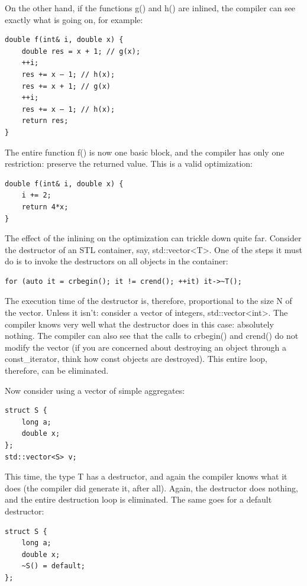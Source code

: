 On the other hand, if the functions g() and h() are inlined, the compiler can see exactly what is going on, for example:

\begin{lstlisting}[style=styleCXX]
double f(int& i, double x) {
	double res = x + 1; // g(x);
	++i;
	res += x – 1; // h(x);
	res += x + 1; // g(x)
	++i;
	res += x – 1; // h(x);
	return res;
}
\end{lstlisting}

The entire function f() is now one basic block, and the compiler has only one restriction: preserve the returned value. This is a valid optimization:

\begin{lstlisting}[style=styleCXX]
double f(int& i, double x) {
	i += 2;
	return 4*x;
}
\end{lstlisting}

The effect of the inlining on the optimization can trickle down quite far. Consider the destructor of an STL container, say, std::vector<T>. One of the steps it must do is to invoke the destructors on all objects in the container:

\begin{lstlisting}[style=styleCXX]
for (auto it = crbegin(); it != crend(); ++it) it->~T();
\end{lstlisting}

The execution time of the destructor is, therefore, proportional to the size N of the vector. Unless it isn't: consider a vector of integers, std::vector<int>. The compiler knows very well what the destructor does in this case: absolutely nothing. The compiler can also see that the calls to crbegin() and crend() do not modify the vector (if you are concerned about destroying an object through a const\_iterator, think how const objects are destroyed). This entire loop, therefore, can be eliminated.

Now consider using a vector of simple aggregates:

\begin{lstlisting}[style=styleCXX]
struct S {
	long a;
	double x;
};
std::vector<S> v;
\end{lstlisting}

This time, the type T has a destructor, and again the compiler knows what it does (the compiler did generate it, after all). Again, the destructor does nothing, and the entire destruction loop is eliminated. The same goes for a default destructor:


\begin{lstlisting}[style=styleCXX]
struct S {
	long a;
	double x;
	~S() = default;
};
\end{lstlisting}

